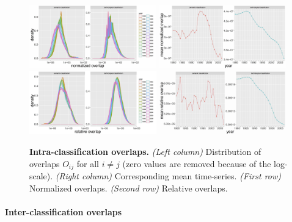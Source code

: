 \documentclass[12pt,twoside,a4paper]{article}
\begin{document}
\begin{figure}[!ht]
\centering
\includegraphics[width=0.49\textwidth]{norm-patents_all_density_semcounts.jpg}
\includegraphics[width=0.49\textwidth]{norm-patents_all_ts_semcounts.jpg} \\
\includegraphics[width=0.49\textwidth]{relative_all_density_semcounts.jpg}
\includegraphics[width=0.49\textwidth]{relative_all_ts_semcounts.jpg}
\caption{
\textbf{Intra-classification overlaps.}
\textit{(Left column)} Distribution of overlaps $O_{ij}$ for all $i\neq j$ (zero values are removed because of the log-scale). \textit{(Right column)} Corresponding mean time-series. \textit{(First row)} Normalized overlaps. \textit{(Second row)} Relative overlaps.}
\label{fig:intra-classif-overlap}
\end{figure}


\paragraph{Inter-classification overlaps}
\end{document}
